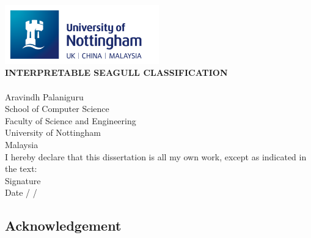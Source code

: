 \documentclass[a4paper,12pt]{report}
\begin{document}
\newpage
\begin{titlepage}
    \begin{center}
        \vspace{0.1em}
        \includegraphics[width=0.5\textwidth]{images/nottingham_logo.png}\\[6em]

        \textbf{INTERPRETABLE SEAGULL CLASSIFICATION}\\[6em]

        \\[4em]

        Aravindh Palaniguru\\
        School of Computer Science\\
        Faculty of Science and Engineering\\
        University of Nottingham\\
        Malaysia\\[6em]

        I hereby declare that this dissertation is all my own work, except as indicated in the text:\\[4em]

        Signature \underline{\hspace{7cm}}\\[2em]
        Date \hspace{1cm} \underline{\hspace{1cm}} / \underline{\hspace{1cm}} / \underline{\hspace{2cm}}
    \end{center}
\end{titlepage}



\newpage
\begin{center}
    \section*{Acknowledgement}
\end{center}
\end{document}
